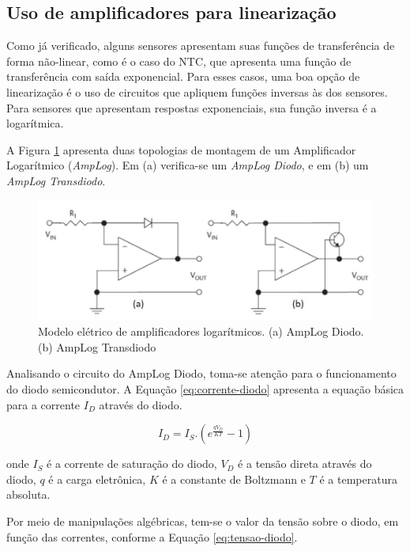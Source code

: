 \documentclass[a4paper]{instrumentacao}
\begin{document}
\subsection{Uso de amplificadores para linearização}

Como já verificado, alguns sensores apresentam suas funções de transferência de forma não-linear, como é o caso do NTC, que apresenta uma função de transferência com saída exponencial. Para esses casos, uma boa opção de linearização é o uso de circuitos que apliquem funções inversas às dos sensores. Para sensores que apresentam respostas exponenciais, sua função inversa é a logarítmica.

A Figura \ref{fig:amplificador-logaritmico} apresenta duas topologias de montagem de um Amplificador Logarítmico (\textit{AmpLog}). Em (a) verifica-se um \textit{AmpLog Diodo}, e em (b) um \textit{AmpLog Transdiodo}. 

\begin{figure}[H]
\center
\includegraphics[width=\textwidth]{amp_log.jpg}
\caption{Modelo elétrico de amplificadores logarítmicos. (a) AmpLog Diodo. (b) AmpLog Transdiodo}
\label{fig:amplificador-logaritmico}
\end{figure}

Analisando o circuito do AmpLog Diodo, toma-se atenção para o funcionamento do diodo semicondutor. A Equação \ref{eq:corrente-diodo} apresenta a equação básica para a corrente $I_D$ através do diodo.

\begin{equation}
	I_D=I_S.(e^{\frac{q V_D}{K T}}-1)
	\label{eq:corrente-diodo}
\end{equation}

\noindent
onde $I_S$ é a corrente de saturação do diodo, $V_D$ é a tensão direta através do diodo, $q$ é a carga eletrônica, $K$ é a constante de Boltzmann e $T$ é a temperatura absoluta.

Por meio de manipulações algébricas, tem-se o valor da tensão sobre o diodo, em função das correntes, conforme a Equação \ref{eq:tensao-diodo}.
\end{document}
